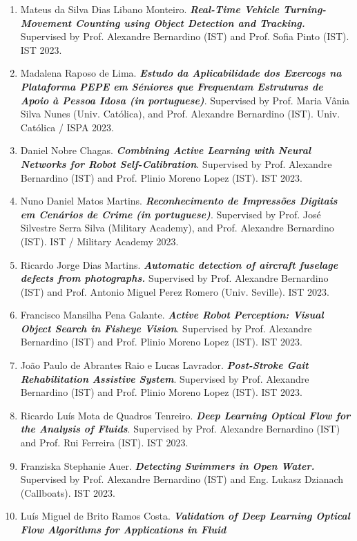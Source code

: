 \begin{enumerate}
\item
  Mateus da Silva Dias Libano Monteiro. \emph{\textbf{Real-Time Vehicle
  Turning-Movement Counting using Object Detection and Tracking.}}
  Supervised by Prof. Alexandre Bernardino (IST) and Prof. Sofia Pinto
  (IST). IST 2023.
\item
  Madalena Raposo de Lima. \emph{\textbf{Estudo da Aplicabilidade dos
  Exercogs na Plataforma PEPE em Séniores que Frequentam Estruturas de
  Apoio à Pessoa Idosa (in portuguese)}}. Supervised by Prof. Maria
  Vânia Silva Nunes (Univ. Católica), and Prof. Alexandre Bernardino
  (IST). Univ. Católica / ISPA 2023.
\item
  Daniel Nobre Chagas. \emph{\textbf{Combining Active Learning with
  Neural Networks for Robot Self-Calibration}}. Supervised by Prof.
  Alexandre Bernardino (IST) and Prof. Plinio Moreno Lopez (IST). IST
  2023.
\item
  Nuno Daniel Matos Martins. \emph{\textbf{Reconhecimento de Impressões
  Digitais em Cenários de Crime (in portuguese)}}. Supervised by Prof.
  José Silvestre Serra Silva (Military Academy), and Prof. Alexandre
  Bernardino (IST). IST / Military Academy 2023.
\item
  Ricardo Jorge Dias Martins. \emph{\textbf{Automatic detection of
  aircraft fuselage defects from photographs.}} Supervised by Prof.
  Alexandre Bernardino (IST) and Prof. Antonio Miguel Perez Romero
  (Univ. Seville). IST 2023.
\item
  Francisco Mansilha Pena Galante. \emph{\textbf{Active Robot
  Perception: Visual Object Search in Fisheye Vision}}. Supervised by
  Prof. Alexandre Bernardino (IST) and Prof. Plinio Moreno Lopez (IST).
  IST 2023.
\item
  João Paulo de Abrantes Raio e Lucas Lavrador.
  \emph{\textbf{Post-Stroke Gait Rehabilitation Assistive System}}.
  Supervised by Prof. Alexandre Bernardino (IST) and Prof. Plinio Moreno
  Lopez (IST). IST 2023.
\item
  Ricardo Luís Mota de Quadros Tenreiro. \emph{\textbf{Deep Learning
  Optical Flow for the Analysis of Fluids}}. Supervised by Prof.
  Alexandre Bernardino (IST) and Prof. Rui Ferreira (IST). IST 2023.
\item
  Franziska Stephanie Auer. \emph{\textbf{Detecting Swimmers in Open
  Water.}} Supervised by Prof. Alexandre Bernardino (IST) and Eng.
  Lukasz Dzianach (Callboats). IST 2023.
\item
  Luís Miguel de Brito Ramos Costa. \emph{\textbf{Validation of Deep
  Learning Optical Flow Algorithms for Applications in Fluid
}}
\end{enumerate}
